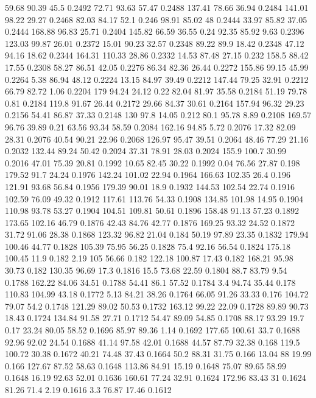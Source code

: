 59.68	90.39	45.5	0.2492
72.71	93.63	57.47	0.2488
137.41	78.66	36.94	0.2484
141.01	98.22	29.27	0.2468
82.03	84.17	52.1	0.246
98.91	85.02	48	0.2444
33.97	85.82	37.05	0.2444
168.88	96.83	25.71	0.2404
145.82	66.59	36.55	0.24
92.35	85.92	9.63	0.2396
123.03	99.87	26.01	0.2372
15.01	90.23	32.57	0.2348
89.22	89.9	18.42	0.2348
47.12	94.16	18.62	0.2344
164.31	110.33	28.86	0.2332
14.53	87.48	27.15	0.232
158.5	88.42	17.55	0.2308
58.27	86.51	42.05	0.2276
86.34	82.36	26.44	0.2272
155.86	99.15	45.99	0.2264
5.38	86.94	48.12	0.2224
13.15	84.97	39.49	0.2212
147.44	79.25	32.91	0.2212
66.79	82.72	1.06	0.2204
179	94.24	24.12	0.22
82.04	81.97	35.58	0.2184
51.19	79.78	0.81	0.2184
119.8	91.67	26.44	0.2172
29.66	84.37	30.61	0.2164
157.94	96.32	29.23	0.2156
54.41	86.87	37.33	0.2148
130	97.8	14.05	0.212
80.1	95.78	8.89	0.2108
169.57	96.76	39.89	0.21
63.56	93.34	58.59	0.2084
162.16	94.85	5.72	0.2076
17.32	82.09	28.31	0.2076
40.54	90.21	22.96	0.2068
126.97	95.47	39.51	0.2064
48.46	77.29	21.16	0.2032
132.44	89.24	50.42	0.2024
37.31	78.91	28.03	0.2024
155.9	100.7	30.99	0.2016
47.01	75.39	20.81	0.1992
10.65	82.45	30.22	0.1992
0.04	76.56	27.87	0.198
179.52	91.7	24.24	0.1976
142.24	101.02	22.94	0.1964
166.63	102.35	26.4	0.196
121.91	93.68	56.84	0.1956
179.39	90.01	18.9	0.1932
144.53	102.54	22.74	0.1916
102.59	76.09	49.32	0.1912
117.61	113.76	54.33	0.1908
134.85	101.98	14.95	0.1904
110.98	93.78	53.27	0.1904
104.51	109.81	50.61	0.1896
158.48	91.13	57.23	0.1892
173.65	102.16	46.79	0.1876
42.43	84.76	42.77	0.1876
169.25	93.32	24.52	0.1872
31.72	91.06	28.38	0.1868
123.32	96.82	21.04	0.184
50.19	97.89	23.35	0.1832
179.94	100.46	44.77	0.1828
105.39	75.95	56.25	0.1828
75.4	92.16	56.54	0.1824
175.18	100.45	11.9	0.182
2.19	105	56.66	0.182
122.18	100.87	17.43	0.182
168.21	95.98	30.73	0.182
130.35	96.69	17.3	0.1816
15.5	73.68	22.59	0.1804
88.7	83.79	9.54	0.1788
162.22	84.06	34.51	0.1788
54.41	86.1	57.52	0.1784
3.4	94.74	35.44	0.178
110.83	104.99	43.18	0.1772
5.13	84.21	38.26	0.1764
66.05	91.26	33.33	0.176
104.72	79.07	54.2	0.1748
121.29	89.02	50.53	0.1732
163.12	99.22	22.09	0.1728
89.89	90.73	18.43	0.1724
134.84	91.58	27.71	0.1712
54.47	89.09	54.85	0.1708
88.17	93.29	19.7	0.17
23.24	80.05	58.52	0.1696
85.97	89.36	1.14	0.1692
177.65	100.61	33.7	0.1688
92.96	92.02	24.54	0.1688
41.14	97.58	42.01	0.1688
44.57	87.79	32.38	0.168
119.5	100.72	30.38	0.1672
40.21	74.48	37.43	0.1664
50.2	88.31	31.75	0.166
13.04	88	19.99	0.166
127.67	87.52	58.63	0.1648
113.86	84.91	15.19	0.1648
75.07	89.65	58.99	0.1648
16.19	92.63	52.01	0.1636
160.61	77.24	32.91	0.1624
172.96	83.43	31	0.1624
81.26	71.4	2.19	0.1616
3.3	76.87	17.46	0.1612
